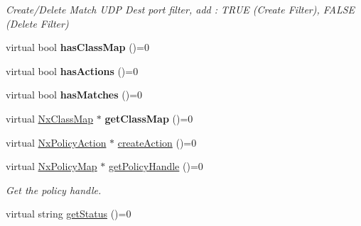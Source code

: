 \begin{DoxyCompactItemize}
\begin{DoxyCompactList}\small\item\em Create/\-Delete Match U\-D\-P Dest port filter, add \-: T\-R\-U\-E (Create Filter), F\-A\-L\-S\-E (Delete Filter) \end{DoxyCompactList}\item 
\hypertarget{classnxos_1_1NxPolicyEntry_a716f92ce413586e91c5f04539748ace9}{virtual bool {\bfseries has\-Class\-Map} ()=0}\label{classnxos_1_1NxPolicyEntry_a716f92ce413586e91c5f04539748ace9}

\item 
\hypertarget{classnxos_1_1NxPolicyEntry_add42fa1d4e45ac4b05430e18af6665f1}{virtual bool {\bfseries has\-Actions} ()=0}\label{classnxos_1_1NxPolicyEntry_add42fa1d4e45ac4b05430e18af6665f1}

\item 
\hypertarget{classnxos_1_1NxPolicyEntry_a448986f34431e548f78a210ac64e6f9e}{virtual bool {\bfseries has\-Matches} ()=0}\label{classnxos_1_1NxPolicyEntry_a448986f34431e548f78a210ac64e6f9e}

\item 
\hypertarget{classnxos_1_1NxPolicyEntry_a5825b0d18d1e7bda41e9c9da99457ea3}{virtual \hyperlink{classnxos_1_1NxClassMap}{Nx\-Class\-Map} $\ast$ {\bfseries get\-Class\-Map} ()=0}\label{classnxos_1_1NxPolicyEntry_a5825b0d18d1e7bda41e9c9da99457ea3}

\item 
virtual \hyperlink{classnxos_1_1NxPolicyAction}{Nx\-Policy\-Action} $\ast$ \hyperlink{classnxos_1_1NxPolicyEntry_a11f35f3e7d9ee30b5aa87c03417e0e22}{create\-Action} ()=0
\item 
\hypertarget{classnxos_1_1NxPolicyEntry_af5eafa3aaeed9c1c08395e38494a8ec3}{virtual \hyperlink{classnxos_1_1NxPolicyMap}{Nx\-Policy\-Map} $\ast$ \hyperlink{classnxos_1_1NxPolicyEntry_af5eafa3aaeed9c1c08395e38494a8ec3}{get\-Policy\-Handle} ()=0}\label{classnxos_1_1NxPolicyEntry_af5eafa3aaeed9c1c08395e38494a8ec3}

\begin{DoxyCompactList}\small\item\em Get the policy handle. \end{DoxyCompactList}\item 
virtual string \hyperlink{classnxos_1_1NxPolicyEntry_a5ed9b0a7ce040d757a69d5db25e7fc70}{get\-Status} ()=0
\end{DoxyCompactItemize}


